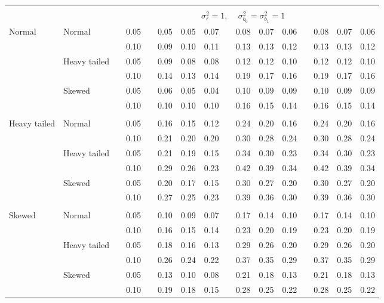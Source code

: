 \documentclass{article} %
\begin{document}
\begin{table}[ht]
\begin{scriptsize}
\begin{center}
\begin{tabular}{ll p{.1cm} c p{.1cm} rrr p{.1cm} rrr p{.1cm} rrr}
&&&&&&&&&&&&&&&\\
& && && \multicolumn{9}{c}{$\sigma_{\varepsilon}^2 = 1$, \ \ $\sigma_{b_0}^2 = \sigma_{b_1}^2 = 1$} \\ \cline{6-16}
Normal       & Normal       && 0.05 &&  0.05 & 0.05 & 0.07 && 0.08 & 0.07 & 0.06 && 0.08 & 0.07 & 0.06 \\ 
             &              && 0.10 &&  0.09 & 0.10 & 0.11 && 0.13 & 0.13 & 0.12 && 0.13 & 0.13 & 0.12 \\ 
             & Heavy tailed && 0.05 &&  0.09 & 0.08 & 0.08 && 0.12 & 0.12 & 0.10 && 0.12 & 0.12 & 0.10 \\ 
             &              && 0.10 &&  0.14 & 0.13 & 0.14 && 0.19 & 0.17 & 0.16 && 0.19 & 0.17 & 0.16 \\ 
             & Skewed       && 0.05 &&  0.06 & 0.05 & 0.04 && 0.10 & 0.09 & 0.09 && 0.10 & 0.09 & 0.09 \\ 
             &              && 0.10 &&  0.10 & 0.10 & 0.10 && 0.16 & 0.15 & 0.14 && 0.16 & 0.15 & 0.14 \\ 
             &&&&&&&&&&&&&&&\\
Heavy tailed & Normal       && 0.05 &&  0.16 & 0.15 & 0.12 && 0.24 & 0.20 & 0.16 && 0.24 & 0.20 & 0.16 \\ 
             &              && 0.10 &&  0.21 & 0.20 & 0.20 && 0.30 & 0.28 & 0.24 && 0.30 & 0.28 & 0.24 \\ 
             & Heavy tailed && 0.05 &&  0.21 & 0.19 & 0.15 && 0.34 & 0.30 & 0.23 && 0.34 & 0.30 & 0.23 \\ 
             &              && 0.10 &&  0.29 & 0.26 & 0.23 && 0.42 & 0.39 & 0.34 && 0.42 & 0.39 & 0.34 \\ 
             & Skewed       && 0.05 &&  0.20 & 0.17 & 0.15 && 0.30 & 0.27 & 0.20 && 0.30 & 0.27 & 0.20 \\ 
             &              && 0.10 &&  0.27 & 0.25 & 0.23 && 0.39 & 0.36 & 0.30 && 0.39 & 0.36 & 0.30 \\
             &&&&&&&&&&&&&&&\\ 
Skewed       & Normal       && 0.05 &&  0.10 & 0.09 & 0.07 && 0.17 & 0.14 & 0.10 && 0.17 & 0.14 & 0.10 \\ 
             &              && 0.10 &&  0.16 & 0.15 & 0.14 && 0.23 & 0.20 & 0.19 && 0.23 & 0.20 & 0.19 \\ 
             & Heavy tailed && 0.05 &&  0.18 & 0.16 & 0.13 && 0.29 & 0.26 & 0.20 && 0.29 & 0.26 & 0.20 \\ 
             &              && 0.10 &&  0.26 & 0.24 & 0.22 && 0.37 & 0.35 & 0.29 && 0.37 & 0.35 & 0.29 \\ 
             & Skewed       && 0.05 &&  0.13 & 0.10 & 0.08 && 0.21 & 0.18 & 0.13 && 0.21 & 0.18 & 0.13 \\ 
             &              && 0.10 &&  0.19 & 0.18 & 0.15 && 0.28 & 0.25 & 0.22 && 0.28 & 0.25 & 0.22 \\ 



\end{tabular}
\end{center}
\end{scriptsize}
\end{table}
\end{document}
